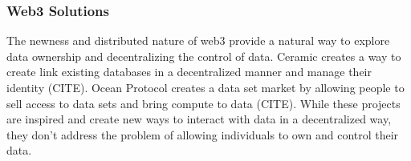 \subsubsection{Web3 Solutions}
The newness and distributed nature of web3 provide a natural way to explore data ownership and decentralizing the control of data. Ceramic creates a way to create link existing databases in a decentralized manner and manage their identity (CITE). Ocean Protocol creates a data set market by allowing people to sell access to data sets and bring compute to data (CITE). While these projects are inspired and create new ways to interact with data in a decentralized way, they don't address the problem of allowing individuals to own and control their data. 